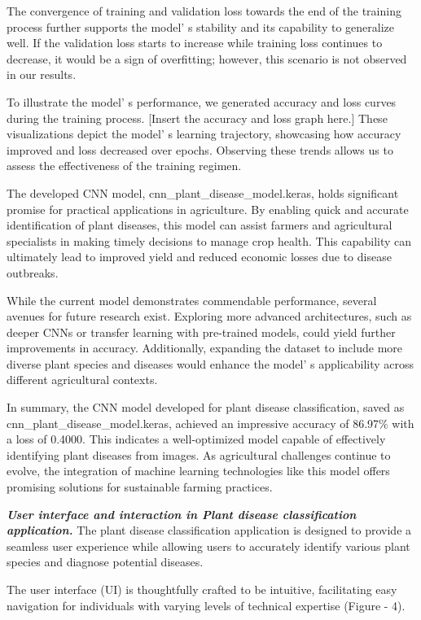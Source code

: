 {{The convergence of training and validation loss towards the end of the
training process further supports the model' s stability
and its capability to generalize well. If the validation loss starts to
increase while training loss continues to decrease, it would be a sign
of overfitting; however, this scenario is not observed in our results.

To illustrate the model' s performance, we generated
accuracy and loss curves during the training process. {[}Insert the
accuracy and loss graph here.{]} These visualizations depict the
model' s learning trajectory, showcasing how accuracy
improved and loss decreased over epochs. Observing these trends allows
us to assess the effectiveness of the training regimen.

The developed CNN model, cnn\_plant\_disease\_model.keras, holds
significant promise for practical applications in agriculture. By
enabling quick and accurate identification of plant diseases, this model
can assist farmers and agricultural specialists in making timely
decisions to manage crop health. This capability can ultimately lead to
improved yield and reduced economic losses due to disease outbreaks.

While the current model demonstrates commendable performance, several
avenues for future research exist. Exploring more advanced
architectures, such as deeper CNNs or transfer learning with pre-trained
models, could yield further improvements in accuracy. Additionally,
expanding the dataset to include more diverse plant species and diseases
would enhance the model' s applicability across different
agricultural contexts.

In summary, the CNN model developed for plant disease classification,
saved as cnn\_plant\_disease\_model.keras, achieved an impressive
accuracy of 86.97\% with a loss of 0.4000. This indicates a
well-optimized model capable of effectively identifying plant diseases
from images. As agricultural challenges continue to evolve, the
integration of machine learning technologies like this model offers
promising solutions for sustainable farming practices.

\emph{{\bfseries User interface and interaction in Plant disease
classification application.}} The plant disease classification
application is designed to provide a seamless user experience while
allowing users to accurately identify various plant species and diagnose
potential diseases.

The user interface (UI) is thoughtfully crafted to be intuitive,
facilitating easy navigation for individuals with varying levels of
technical expertise (Figure - 4).

}}
